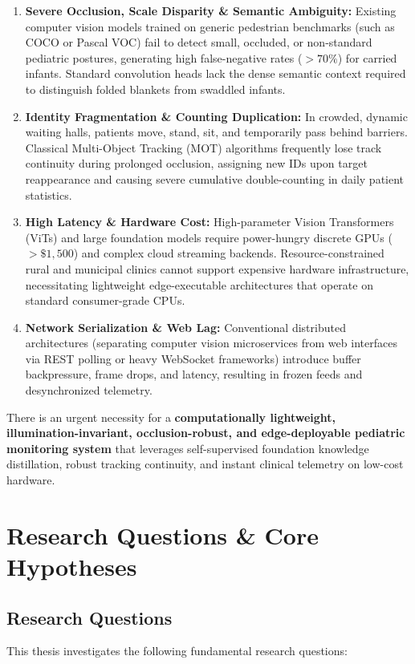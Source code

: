 \begin{enumerate}
    \item \textbf{Severe Occlusion, Scale Disparity \& Semantic Ambiguity:} Existing computer vision models trained on generic pedestrian benchmarks (such as COCO or Pascal VOC) fail to detect small, occluded, or non-standard pediatric postures, generating high false-negative rates ($>70\%$) for carried infants. Standard convolution heads lack the dense semantic context required to distinguish folded blankets from swaddled infants.
    \item \textbf{Identity Fragmentation \& Counting Duplication:} In crowded, dynamic waiting halls, patients move, stand, sit, and temporarily pass behind barriers. Classical Multi-Object Tracking (MOT) algorithms frequently lose track continuity during prolonged occlusion, assigning new IDs upon target reappearance and causing severe cumulative double-counting in daily patient statistics.
    \item \textbf{High Latency \& Hardware Cost:} High-parameter Vision Transformers (ViTs) and large foundation models require power-hungry discrete GPUs ($>\$1,500$) and complex cloud streaming backends. Resource-constrained rural and municipal clinics cannot support expensive hardware infrastructure, necessitating lightweight edge-executable architectures that operate on standard consumer-grade CPUs.
    \item \textbf{Network Serialization \& Web Lag:} Conventional distributed architectures (separating computer vision microservices from web interfaces via REST polling or heavy WebSocket frameworks) introduce buffer backpressure, frame drops, and latency, resulting in frozen feeds and desynchronized telemetry.
\end{enumerate}

There is an urgent necessity for a \textbf{computationally lightweight, illumination-invariant, occlusion-robust, and edge-deployable pediatric monitoring system} that leverages self-supervised foundation knowledge distillation, robust tracking continuity, and instant clinical telemetry on low-cost hardware.

\section{Research Questions \& Core Hypotheses}

\subsection{Research Questions}
This thesis investigates the following fundamental research questions:

